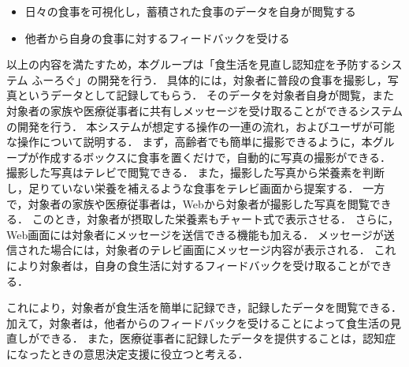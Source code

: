 \documentclass[../report]{subfiles}
\begin{document}
\begin{itemize}
    \item 日々の食事を可視化し，蓄積された食事のデータを自身が閲覧する
    \item 他者から自身の食事に対するフィードバックを受ける
\end{itemize}

以上の内容を満たすため，本グループは「食生活を見直し認知症を予防するシステム ふーろぐ」の開発を行う．
具体的には，対象者に普段の食事を撮影し，写真というデータとして記録してもらう．
そのデータを対象者自身が閲覧，また対象者の家族や医療従事者に共有しメッセージを受け取ることができるシステムの開発を行う．
本システムが想定する操作の一連の流れ，およびユーザが可能な操作について説明する．
まず，高齢者でも簡単に撮影できるように，本グループが作成するボックスに食事を置くだけで，自動的に写真の撮影ができる．
撮影した写真はテレビで閲覧できる．
また，撮影した写真から栄養素を判断し，足りていない栄養を補えるような食事をテレビ画面から提案する．
一方で，対象者の家族や医療従事者は，Webから対象者が撮影した写真を閲覧できる．
このとき，対象者が摂取した栄養素もチャート式で表示させる．
さらに，Web画面には対象者にメッセージを送信できる機能も加える．
メッセージが送信された場合には，対象者のテレビ画面にメッセージ内容が表示される．
これにより対象者は，自身の食生活に対するフィードバックを受け取ることができる．

これにより，対象者が食生活を簡単に記録でき，記録したデータを閲覧できる．加えて，対象者は，他者からのフィードバックを受けることによって食生活の見直しができる．
また，医療従事者に記録したデータを提供することは，認知症になったときの意思決定支援に役立つと考える．
\end{document}
